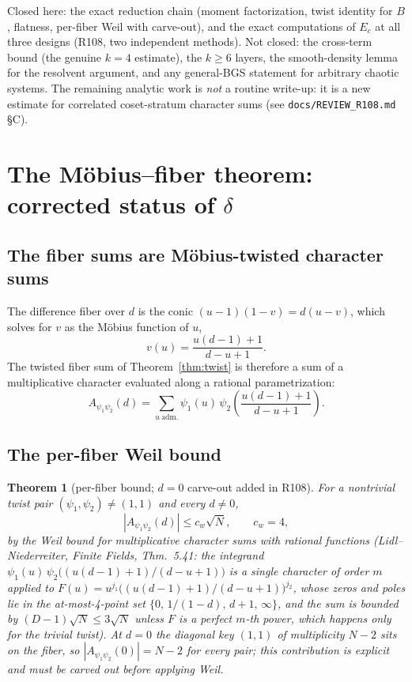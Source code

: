 \documentclass[11pt,reqno]{amsart}
\newtheorem{theorem}{Theorem}[section]
\theoremstyle{definition}
\begin{document}
Closed here: the exact reduction chain (moment factorization, twist
identity for $B$, flatness, per-fiber Weil with carve-out), and the
exact computations of $E_c$ at all three designs (R108, two independent
methods).  Not closed: the cross-term bound (the genuine $k{=}4$
estimate), the $k \ge 6$ layers, the smooth-density lemma for the
resolvent argument, and any general-BGS statement for arbitrary chaotic
systems.  The remaining analytic work is \emph{not} a routine write-up:
it is a new estimate for correlated coset-stratum character sums (see
\texttt{docs/REVIEW\_R108.md} \S C).



\section{The M\"obius--fiber theorem: corrected status of $\delta$}
\label{sec:r101}

\subsection{The fiber sums are M\"obius-twisted character sums}

The difference fiber over $d$ is the conic
$(u{-}1)(1{-}v) = d(u{-}v)$, which solves for $v$ as the M\"obius
function of $u$,
\[
  v(u) = \frac{u(d-1)+1}{\,d-u+1\,}.
\]
The twisted fiber sum of Theorem~\ref{thm:twist} is therefore a sum of
a multiplicative character evaluated along a rational parametrization:
\[
  A_{\psi_1\psi_2}(d) = \sum_{u \ \mathrm{adm.}} \psi_1(u)\,
  \psi_2\!\left(\frac{u(d-1)+1}{d-u+1}\right).
\]

\subsection{The per-fiber Weil bound}

\begin{theorem}[per-fiber bound; $d=0$ carve-out added in R108]
\label{thm:fiberweil}
For a nontrivial twist pair $(\psi_1,\psi_2) \neq (1,1)$ and every
$d \neq 0$,
\[
  |A_{\psi_1\psi_2}(d)| \le c_w \sqrt{N}, \qquad c_w = 4,
\]
by the Weil bound for multiplicative character sums with rational
functions (Lidl--Niederreiter, \emph{Finite Fields}, Thm.~5.41: the
integrand $\psi_1(u)\,\psi_2\!\bigl((u(d{-}1)+1)/(d{-}u{+}1)\bigr)$ is a
single character of order $m$ applied to
$F(u) = u^{j_1}\bigl((u(d{-}1)+1)/(d{-}u{+}1)\bigr)^{j_2}$, whose zeros
and poles lie in the at-most-4-point set
$\{0,\,1/(1{-}d),\,d{+}1,\,\infty\}$, and the sum is bounded by
$(D-1)\sqrt{N} \le 3\sqrt{N}$ unless $F$ is a perfect $m$-th power,
which happens only for the trivial twist).  At $d = 0$ the diagonal key
$(1,1)$ of multiplicity $N-2$ sits on the fiber, so
$|A_{\psi_1\psi_2}(0)| = N-2$ for \emph{every} pair; this contribution
is explicit and must be carved out before applying Weil.
\end{theorem}
\end{document}
